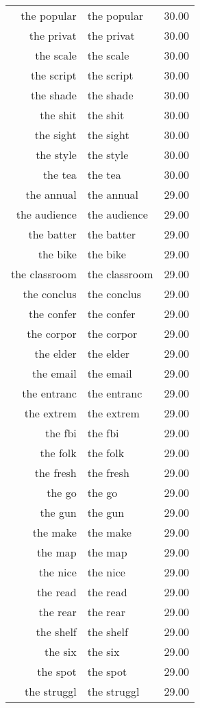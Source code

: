 \begin{table}[ht]
\begin{tabular}{rlr}
  the popular & the popular & 30.00 \\ 
  the privat & the privat & 30.00 \\ 
  the scale & the scale & 30.00 \\ 
  the script & the script & 30.00 \\ 
  the shade & the shade & 30.00 \\ 
  the shit & the shit & 30.00 \\ 
  the sight & the sight & 30.00 \\ 
  the style & the style & 30.00 \\ 
  the tea & the tea & 30.00 \\ 
  the annual & the annual & 29.00 \\ 
  the audience & the audience & 29.00 \\ 
  the batter & the batter & 29.00 \\ 
  the bike & the bike & 29.00 \\ 
  the classroom & the classroom & 29.00 \\ 
  the conclus & the conclus & 29.00 \\ 
  the confer & the confer & 29.00 \\ 
  the corpor & the corpor & 29.00 \\ 
  the elder & the elder & 29.00 \\ 
  the email & the email & 29.00 \\ 
  the entranc & the entranc & 29.00 \\ 
  the extrem & the extrem & 29.00 \\ 
  the fbi & the fbi & 29.00 \\ 
  the folk & the folk & 29.00 \\ 
  the fresh & the fresh & 29.00 \\ 
  the go & the go & 29.00 \\ 
  the gun & the gun & 29.00 \\ 
  the make & the make & 29.00 \\ 
  the map & the map & 29.00 \\ 
  the nice & the nice & 29.00 \\ 
  the read & the read & 29.00 \\ 
  the rear & the rear & 29.00 \\ 
  the shelf & the shelf & 29.00 \\ 
  the six & the six & 29.00 \\ 
  the spot & the spot & 29.00 \\ 
  the struggl & the struggl & 29.00 \\ 

\end{tabular}
\end{table}
